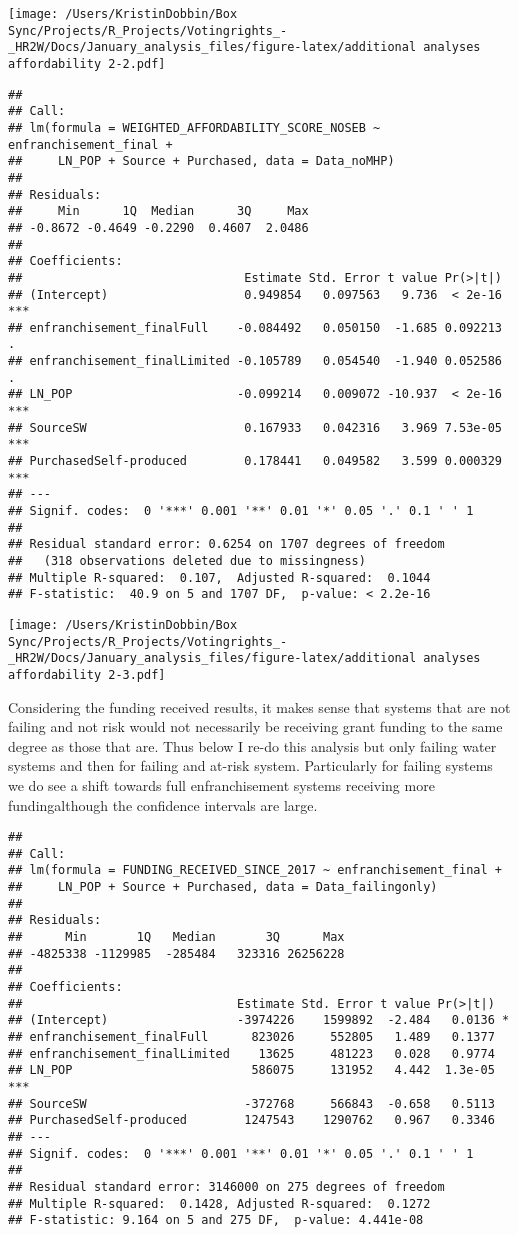 \documentclass[
]{article}
\begin{document}
\texttt{[image: /Users/KristinDobbin/Box Sync/Projects/R\_Projects/Votingrights\_-\_HR2W/Docs/January\_analysis\_files/figure-latex/additional analyses affordability 2-2.pdf]}

\begin{verbatim}
## 
## Call:
## lm(formula = WEIGHTED_AFFORDABILITY_SCORE_NOSEB ~ enfranchisement_final + 
##     LN_POP + Source + Purchased, data = Data_noMHP)
## 
## Residuals:
##     Min      1Q  Median      3Q     Max 
## -0.8672 -0.4649 -0.2290  0.4607  2.0486 
## 
## Coefficients:
##                               Estimate Std. Error t value Pr(>|t|)    
## (Intercept)                   0.949854   0.097563   9.736  < 2e-16 ***
## enfranchisement_finalFull    -0.084492   0.050150  -1.685 0.092213 .  
## enfranchisement_finalLimited -0.105789   0.054540  -1.940 0.052586 .  
## LN_POP                       -0.099214   0.009072 -10.937  < 2e-16 ***
## SourceSW                      0.167933   0.042316   3.969 7.53e-05 ***
## PurchasedSelf-produced        0.178441   0.049582   3.599 0.000329 ***
## ---
## Signif. codes:  0 '***' 0.001 '**' 0.01 '*' 0.05 '.' 0.1 ' ' 1
## 
## Residual standard error: 0.6254 on 1707 degrees of freedom
##   (318 observations deleted due to missingness)
## Multiple R-squared:  0.107,  Adjusted R-squared:  0.1044 
## F-statistic:  40.9 on 5 and 1707 DF,  p-value: < 2.2e-16
\end{verbatim}

\texttt{[image: /Users/KristinDobbin/Box Sync/Projects/R\_Projects/Votingrights\_-\_HR2W/Docs/January\_analysis\_files/figure-latex/additional analyses affordability 2-3.pdf]}

Considering the funding received results, it makes sense that systems
that are not failing and not risk would not necessarily be receiving
grant funding to the same degree as those that are. Thus below I re-do
this analysis but only failing water systems and then for failing and
at-risk system. Particularly for failing systems we do see a shift
towards full enfranchisement systems receiving more fundingalthough the
confidence intervals are large.

\begin{verbatim}
## 
## Call:
## lm(formula = FUNDING_RECEIVED_SINCE_2017 ~ enfranchisement_final + 
##     LN_POP + Source + Purchased, data = Data_failingonly)
## 
## Residuals:
##      Min       1Q   Median       3Q      Max 
## -4825338 -1129985  -285484   323316 26256228 
## 
## Coefficients:
##                              Estimate Std. Error t value Pr(>|t|)    
## (Intercept)                  -3974226    1599892  -2.484   0.0136 *  
## enfranchisement_finalFull      823026     552805   1.489   0.1377    
## enfranchisement_finalLimited    13625     481223   0.028   0.9774    
## LN_POP                         586075     131952   4.442  1.3e-05 ***
## SourceSW                      -372768     566843  -0.658   0.5113    
## PurchasedSelf-produced        1247543    1290762   0.967   0.3346    
## ---
## Signif. codes:  0 '***' 0.001 '**' 0.01 '*' 0.05 '.' 0.1 ' ' 1
## 
## Residual standard error: 3146000 on 275 degrees of freedom
## Multiple R-squared:  0.1428, Adjusted R-squared:  0.1272 
## F-statistic: 9.164 on 5 and 275 DF,  p-value: 4.441e-08
\end{verbatim}
\end{document}
